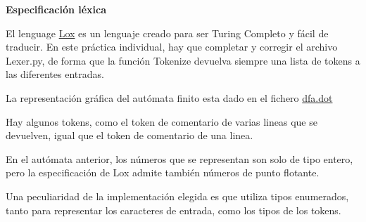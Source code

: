 
\author{Helmut Krauser}
\date{\today}
\title{}


\vspace{5mm}\centerline{\large\bf Especificación léxica}\vspace{5mm}
\label{sec:orgeffdd14}

El lenguage \href{https://craftinginterpreters.com/the-lox-language.html}{Lox} es un lenguaje creado para ser Turing Completo y fácil de traducir.
En este práctica individual, hay que completar y corregir el archivo Lexer.py, de forma que la 
función Tokenize devuelva siempre una lista de tokens a las diferentes entradas.

La representación gráfica del autómata finito esta dado en el fichero \href{./dfa.dot}{dfa.dot}

\label{sec:org6783240}


Hay algunos tokens, como el token de comentario de varias lineas que se devuelven, igual que el token de comentario de una linea.

\label{sec:orgf19f0da}

En el autómata anterior, los números que se representan son solo de tipo entero, pero la especificación de Lox admite también números de punto flotante.

\label{sec:orgc046b2f}


Una peculiaridad de la implementación elegida es que utiliza tipos enumerados, tanto para representar los caracteres de entrada, como los tipos de los tokens.

\label{sec:orgca7fc96}

